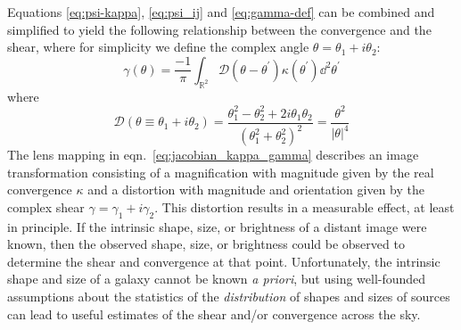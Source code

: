 Equations \ref{eq:psi-kappa}, \ref{eq:psi_ij} and \ref{eq:gamma-def} can be combined and simplified to yield the following relationship between the convergence and the shear, where for simplicity we define the complex angle $\theta = \theta_1 + i\theta_2$:
\begin{equation}
  \label{eq:gamma-kappa}
  \gamma(\theta) 
  = \frac{-1}{\pi}\int_{\mathbb{R}^2} \mathcal{D}(\theta - 
  \theta^\prime)\kappa(\theta^\prime) \dd^2\theta^\prime
\end{equation}
where 
\begin{equation}
  \label{eq:scriptD}
  \mathcal{D}(\theta \equiv \theta_1+i\theta_2) 
  = \frac{\theta_1^2 - \theta_2^2 + 2i\theta_1\theta_2}{(\theta_1^2+\theta_2^2)^2}
  = \frac{\theta^2}{|\theta|^4}
\end{equation}
The lens mapping in eqn.~\ref{eq:jacobian_kappa_gamma} describes an
image transformation consisting of a magnification with magnitude 
given by the real convergence $\kappa$
and a distortion with magnitude and orientation given by the complex shear
$\gamma = \gamma_1 + i\gamma_2$.  This distortion results in a measurable
effect, at least in principle.  If the intrinsic shape, size, or brightness
of a distant image were known, then the observed shape, size, or brightness
could be observed to determine the shear and convergence at that point.
Unfortunately, the intrinsic shape and size of a galaxy cannot be known
{\it a priori}, but using well-founded assumptions about the statistics
of the {\it distribution} of shapes and sizes of sources can lead to
useful estimates of the shear and/or convergence across the sky.


